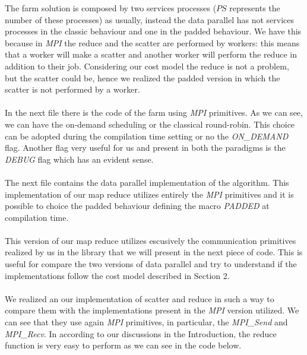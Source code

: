 The farm solution is composed by two services processes ($PS$ represents the number of these processes) as usually, instead the data parallel has not services processes in the classic behaviour and one in the padded behaviour. We have this because in \textit{MPI} the reduce and the scatter are performed by workers: this means that a worker will make a scatter and another worker will perform the reduce in addition to their job. Considering our cost model the reduce is not a problem, but the scatter could be, hence we realized the padded version in which the scatter is not performed by a worker.
\ \\

\ \\
In the next file there is the code of the farm using \textit{MPI} primitives. As we can see, we can have the on-demand scheduling or the classical round-robin. This choice can be adopted during the compilation time setting or no the \textit{ON\_DEMAND} flag. Another flag very useful for us and present in both the paradigms is the \textit{DEBUG} flag which has an evident sense.
\ \\

\ \\
The next file contains the data parallel implementation of the algorithm. This implementation of our map reduce utilizes entirely the \textit{MPI} primitives and it is possible to choice the padded behaviour defining the macro \textit{PADDED} at compilation time.
\ \\

\ \\
This version of our map reduce utilizes escusively the communication primitives realized by us in the library that we will present in the next piece of code. This is useful for compare the two versions of data parallel and try to understand if the implementations follow the cost model described in Section 2.
\ \\

\ \\
We realized an our implementation of scatter and reduce in such a way to compare them with the implementations present in the \textit{MPI} version utilized. We can see that they use again \textit{MPI} primitives, in particular, the \textit{MPI\_Send} and \textit{MPI\_Recv}. In according to our discussions in the Introduction, the reduce function is very easy to perform as we can see in the code below.
\ \\

\ \\
\ \\
